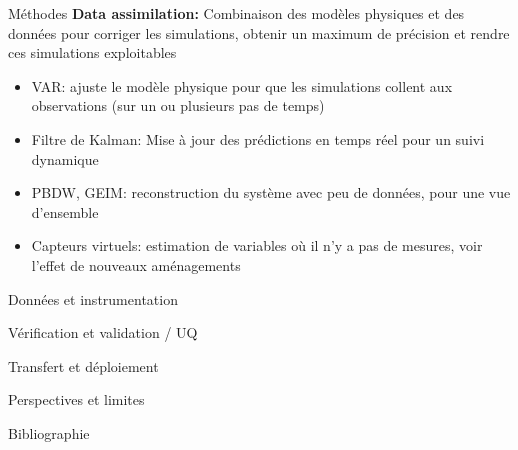 \documentclass{beamer}
\begin{document}
\begin{frame}{Méthodes}
    \textbf{Data assimilation:} Combinaison des modèles physiques et des données pour corriger les simulations, obtenir un maximum de précision et rendre ces simulations exploitables %
    \begin{itemize}
        \item VAR: ajuste le modèle physique pour que les simulations collent aux observations (sur un ou plusieurs pas de temps)
        \item Filtre de Kalman: Mise à jour des prédictions en temps réel pour un suivi dynamique
        \item PBDW, GEIM: reconstruction du système avec peu de données, pour une vue d'ensemble
        \item Capteurs virtuels: estimation de variables où il n'y a pas de mesures, voir l'effet de nouveaux aménagements
    \end{itemize}

\end{frame}


\begin{frame}{Données et instrumentation}
\end{frame}


\begin{frame}{Vérification et validation / UQ}
    
\end{frame}


\begin{frame}{Transfert et déploiement}
    
\end{frame}


\begin{frame}{Perspectives et limites}
    
\end{frame}


\begin{frame}{Bibliographie}
\end{frame}
\end{document}
